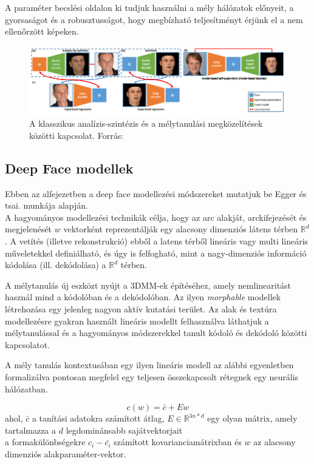 \documentclass[12pt,a4]{article}
\begin{document}
	
	A paraméter becslési oldalon ki tudjuk használni a mély hálózatok előnyeit, a gyorsaságot és a robusztusságot, hogy megbízható teljesítményt érjünk el a nem ellenőrzött képeken.
	
	\begin{figure}[h]	
		\centering
		\includegraphics[width=1\linewidth]{deep}
		\caption{A klasszikus analízis-szintézis és a mélytanulási megközelítések közötti kapcsolat. 
			Forrás:\cite{3dmm}}
	\end{figure}
	
	\newpage
	\subsection{Deep Face modellek}
    Ebben az alfejezetben a deep face modellezési módszereket mutatjuk be \cite{3dmm} Egger és tsai. munkája alapján. \\
 
	A hagyományos modellezési technikák célja, hogy
	az arc alakját, arckifejezését és megjelenését $w$ vektorként reprezentálják egy
	alacsony dimenziós látens térben $\mathbb{R}^d$ . A vetítés (illetve rekonstrukció) ebből a latens térből lineáris vagy multi lineáris műveletekkel definiálható, és úgy is felfogható, mint a nagy-dimenziós információ kódolása (ill.
	dekódolása) a $\mathbb{R}^d$ térben.
	
	
	A mélytanulás új eszközt nyújt a 3DMM-ek építéséhez, amely nemlinearitást használ mind a kódolóban és a dekódolóban. Az ilyen \textit{morphable} modellek létrehozása egy jelenleg nagyon aktív kutatási terület.
	Az alak és textúra modellezésre gyakran használt lineáris modellt felhasználva láthatjuk a mélytanulással és a hagyományos módszerekkel tanult kódoló és dekódoló közötti kapcsolatot.
	
	
	A mély tanulás kontextusában egy ilyen lineáris modell
	az alábbi egyenletben formalizálva pontosan megfelel egy teljesen összekapcsolt rétegnek egy
	neurális hálózatban.
	
	\begin{mdframed}
	\begin{equation}
		c(w) = \bar{c} + Ew 
	\end{equation}
		  ahol, $\bar{c}$ a tanítási adatokra számított átlag, $E \in \mathbb{R}^{3n*d}$ egy olyan mátrix, amely tartalmazza a $d$ legdominánsabb sajátvektorjait \\
		  a formakülönbségekre $c_i - \bar{c_i}$ számított kovarianciamátrixban és
		$w$ az alacsony dimenziós alakparaméter-vektor.
	\end{mdframed}
	
\end{document}
